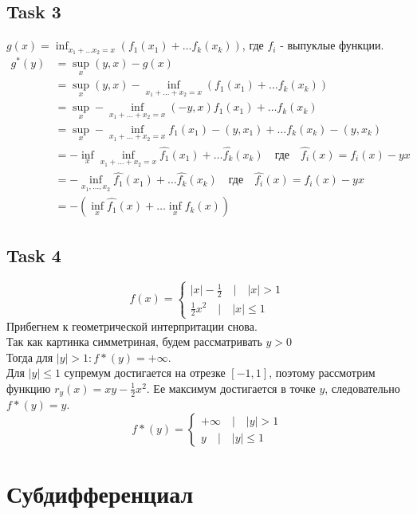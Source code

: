 \documentclass[12pt]{exam}
\begin{document}
\subsection*{Task 3}
$g(x) = \inf_{x_1 + \ldots x_2 = x} (f_1(x_1) + \ldots f_k(x_k))$, 
где $f_i$ - выпуклые функции.
\begin{align*}
    g^*(y) 
        &= \sup_x (y, x) - g(x) \\
        &= \sup_x (y, x) - \inf_{x_1 + \ldots + x_2 = x} (f_1(x_1) + \ldots f_k(x_k)) \\
        &= \sup_x -\inf_{x_1 + \ldots + x_2 = x} (-y, x) f_1(x_1) + \ldots f_k(x_k) \\
        &= \sup_x -\inf_{x_1 + \ldots + x_2 = x} f_1(x_1) - (y, x_1) + \ldots f_k(x_k) - (y, x_k) \\
        &= -\inf_x \inf_{x_1 + \ldots + x_2 = x} \hat{f_1}(x_1) + \ldots \hat{f_k}(x_k) \quad \textit{где} \quad \hat{f_i}(x) = f_i(x) - yx \\
        &= -\inf_{x_1, \ldots, x_2 } \hat{f_1}(x_1) + \ldots \hat{f_k}(x_k) \quad \textit{где} \quad \hat{f_i}(x) = f_i(x) - yx \\
        &= - \left( \inf_x \hat{f_1}(x) + \ldots \inf_x \hat{f_k}(x) \right)
\end{align*}

\subsection*{Task 4}
$$
    f(x) = \begin{cases}
        |x| - \frac{1}{2} \quad | \quad |x| > 1 \\
        \frac{1}{2} x^2 \quad | \quad |x| \leq 1 
    \end{cases}
$$
Прибегнем к геометрической интерпритации снова.\\
Так как картинка симметриная, будем рассматривать $y > 0$\\
Тогда для $|y| > 1: f*(y) = + \infty$.\\
Для $|y| \leq 1$ супремум достигается на отрезке $[-1, 1]$, поэтому 
рассмотрим функцию $r_y(x) = xy - \frac{1}{2} x^2$. 
Ее максимум достигается в точке $y$, следовательно $f*(y) = y$. \\
$$
f*(y) = \begin{cases}
    +\infty \quad | \quad |y| > 1 \\
    y \quad | \quad |y| \leq 1
\end{cases}
$$

\section*{Субдифференциал}
\end{document}
